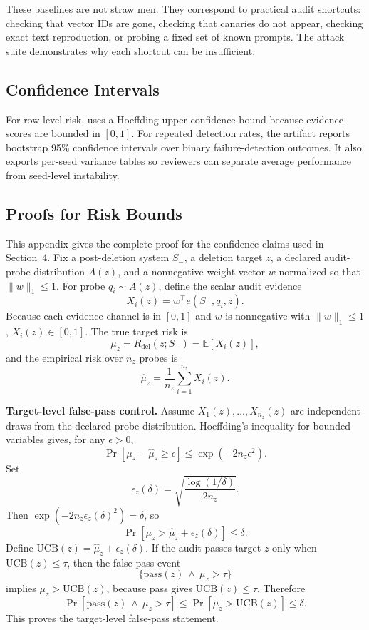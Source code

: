 These baselines are not straw men. They correspond to practical audit shortcuts: checking that vector IDs are gone, checking that canaries do not appear, checking exact text reproduction, or probing a fixed set of known prompts. The attack suite demonstrates why each shortcut can be insufficient.

\subsection{Confidence Intervals}

For row-level risk, \method{} uses a Hoeffding upper confidence bound because evidence scores are bounded in $[0,1]$. For repeated detection rates, the artifact reports bootstrap 95\% confidence intervals over binary failure-detection outcomes. It also exports per-seed variance tables so reviewers can separate average performance from seed-level instability.

\subsection{Proofs for Risk Bounds}

This appendix gives the complete proof for the confidence claims used in Section~4. Fix a post-deletion system $S_-$, a deletion target $z$, a declared audit-probe distribution $A(z)$, and a nonnegative weight vector $w$ normalized so that $\|w\|_1\leq 1$. For probe $q_i\sim A(z)$, define the scalar audit evidence
\[
X_i(z)=w^\top e(S_-,q_i,z).
\]
Because each evidence channel is in $[0,1]$ and $w$ is nonnegative with $\|w\|_1\leq 1$, $X_i(z)\in[0,1]$. The true target risk is
\[
\mu_z=R_{\mathrm{del}}(z;S_-)=\mathbb{E}[X_i(z)],
\]
and the empirical risk over $n_z$ probes is
\[
\hat\mu_z=\frac{1}{n_z}\sum_{i=1}^{n_z} X_i(z).
\]

\textbf{Target-level false-pass control.}
Assume $X_1(z),\ldots,X_{n_z}(z)$ are independent draws from the declared probe distribution. Hoeffding's inequality for bounded variables gives, for any $\epsilon>0$,
\[
\Pr[\mu_z-\hat\mu_z\geq \epsilon]\leq \exp(-2n_z\epsilon^2).
\]
Set
\[
\epsilon_z(\delta)=\sqrt{\frac{\log(1/\delta)}{2n_z}}.
\]
Then $\exp(-2n_z\epsilon_z(\delta)^2)=\delta$, so
\[
\Pr[\mu_z>\hat\mu_z+\epsilon_z(\delta)]\leq\delta.
\]
Define $\mathrm{UCB}(z)=\hat\mu_z+\epsilon_z(\delta)$. If the audit passes target $z$ only when $\mathrm{UCB}(z)\leq\tau$, then the false-pass event
\[
\{\mathrm{pass}(z)\ \wedge\ \mu_z>\tau\}
\]
implies $\mu_z>\mathrm{UCB}(z)$, because pass gives $\mathrm{UCB}(z)\leq\tau$. Therefore
\[
\Pr[\mathrm{pass}(z)\ \wedge\ \mu_z>\tau]
\leq
\Pr[\mu_z>\mathrm{UCB}(z)]
\leq \delta.
\]
This proves the target-level false-pass statement.

